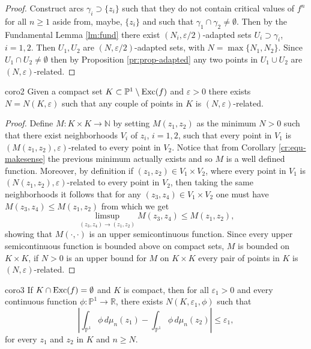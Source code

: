 \begin{proof}
Construct arcs $\gamma_i\supset \{z_i\}$ such that they do not contain critical values of $f^n$ for all $n\geq 1$ aside from, maybe, $\{z_i\}$ and such that $\gamma_1\cap \gamma_2\neq \emptyset$. Then by the Fundamental Lemma \ref{lm:fund} there exist $(N_i,\varepsilon/2)$-adapted sets $U_i \supset \gamma_i$, $i=1,2$. Then $U_1,U_2$ are $(N,\varepsilon/2)$-adapted sets, with $N=\max\{N_1,N_2\}$. Since $U_1\cap U_2\neq \emptyset$ then by Proposition \ref{pr:prop-adapted} any two points in $U_1\cup U_2$ are $(N,\varepsilon)$-related.
\end{proof}

\begin{mycoro}{}{coro2}
Given a compact set $K\subset \mathbb{P}^1\setminus \text{Exc}(f)$ and $\varepsilon>0$ there exists $N = N(K,\varepsilon)$ such that any couple of points in $K$ is $(N,\varepsilon)$-related.
\end{mycoro}

\begin{proof}
Define $M:K\times K \rightarrow \mathbb{N}$ by setting $M(z_1,z_2)$ as the minimum $N>0$ such that there exist neighborhoods $V_i$ of $z_i$, $i=1,2$, such that every point in $V_1$ is $(M(z_1,z_2),\varepsilon)$-related to every point in $V_2$. Notice that from Corollary \eqref{cr:equ-makesense} the previous minimum actually exists and so $M$ is a well defined function. Moreover, by definition if $(z_1,z_2)\in V_1\times V_2$, where every point in $V_1$ is $(N(z_1,z_2),\varepsilon)$-related to every point in $V_2$, then taking the same neighborhoods it follows that for any $(z_3,z_4)\in V_1\times V_2$ one must have $M(z_3,z_4) \leq M(z_1,z_2)$ from which we get
$$\limsup_{(z_3,z_4) \rightarrow (z_1,z_2)}M(z_3,z_4) \leq M(z_1,z_2),$$
showing that $M(\cdot,\cdot)$ is an upper semicontinuous function. Since every upper semicontinuous function is bounded above on compact sets, $M$ is bounded on $K\times K$, if $N>0$ is an upper bound for $M$ on $K\times K$ every pair of points in $K$ is $(N,\varepsilon)$-related.
\end{proof}

\begin{mycoro}{}{coro3}
If $K\cap \text{Exc}(f)=\emptyset$ and $K$ is compact, then for all $\varepsilon_1>0$ and every continuous function $\phi:\mathbb{P}^1\rightarrow \mathbb{R}$, there exists $N(K,\varepsilon_1,\phi)$ such that
$$\left| \int_{\mathbb{P}^1}\phi \, d\mu_n(z_1)-\int_{\mathbb{P}^1} \phi\, d\mu_n(z_2) \right| \leq \varepsilon_1,$$
for every $z_1$ and $z_2$ in $K$ and $n\geq N$.
\end{mycoro}


